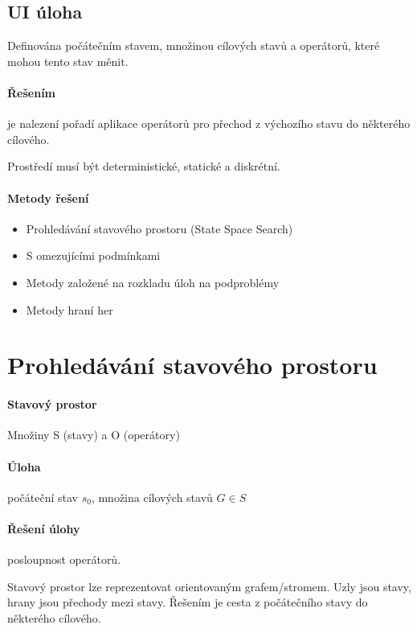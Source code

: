 \documentclass[a4paper, 11pt]{report}
\begin{document}
\subsection{UI úloha}
Definována počátečním stavem, množinou cílových stavů a operátorů, které mohou tento stav měnit.
\paragraph{Řešením} je nalezení pořadí aplikace operátorů pro přechod z výchozího stavu do některého cílového.

Prostředí musí být deterministické, statické a diskrétní.

\paragraph{Metody řešení}
\begin{itemize}
	\item Prohledávání stavového prostoru (State Space Search)
	\item S omezujícími podmínkami
	\item Metody založené na rozkladu úloh na podproblémy
	\item Metody hraní her
\end{itemize}

\section{Prohledávání stavového prostoru}

\paragraph{Stavový prostor}
Množiny S (stavy) a O (operátory)

\paragraph{Úloha}
počáteční stav $s_0$, množina cílových stavů $G \in S$

\paragraph{Řešení úlohy}
posloupnost operátorů.

Stavový prostor lze reprezentovat orientovaným grafem/stromem. Uzly jsou stavy, hrany jsou přechody mezi stavy. Řešením je cesta z počátečního stavy do některého cílového.
\end{document}
